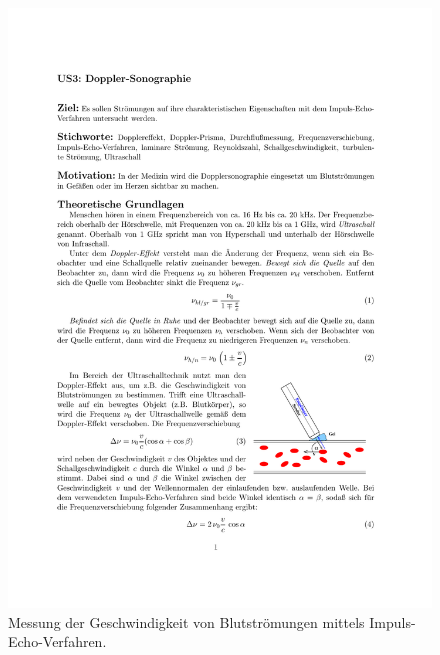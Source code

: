 \begin{figure}
  \centering
  \includegraphics[scale=0.8]{content/1.pdf}
\caption{Messung der Geschwindigkeit von Blutströmungen mittels Impuls-Echo-Verfahren\cite{anleitungUS3}.}
  \label{fig:1}
\end{figure}
